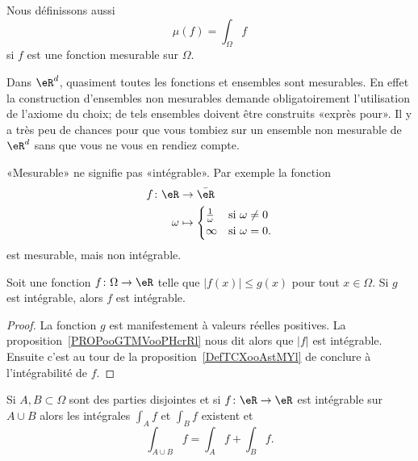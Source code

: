 Nous définissons aussi
\begin{equation}
    \mu(f)=\int_{\Omega}f
\end{equation}
si \( f\) est une fonction mesurable sur \( \Omega\).

\begin{remark}
    Dans \( \eR^d\), quasiment toutes les fonctions et ensembles sont mesurables. En effet la construction d'ensembles non mesurables demande obligatoirement l'utilisation de l'axiome du choix; de tels ensembles doivent être construits «exprès pour». Il y a très peu de chances pour que vous tombiez sur un ensemble non mesurable de \( \eR^d\) sans que vous ne vous en rendiez compte.
\end{remark}

\begin{remark}
    «Mesurable» ne signifie pas «intégrable». Par exemple la fonction
    \begin{equation}
        \begin{aligned}
            f\colon \eR&\to \bar\eR \\
            \omega&\mapsto\begin{cases}
            \frac{1}{ \omega }    &   \text{si } \omega\neq 0\\
            \infty    &    \text{si }\omega=0.
            \end{cases}
        \end{aligned}
    \end{equation}
    est mesurable, mais non intégrable.
\end{remark}

\begin{lemma}   \label{LemPfHgal}
    Soit une fonction \( f\colon \Omega\to \eR\) telle que \( | f(x)|\leq g(x) \) pour tout \( x\in\Omega\). Si \( g\) est intégrable, alors \( f\) est intégrable.
\end{lemma}

\begin{proof}
    La fonction \( g\) est manifestement à valeurs réelles positives. La proposition~\ref{PROPooGTMVooPHcrRl} nous dit alors que \( | f |\) est intégrable. Ensuite c'est au tour de la proposition~\ref{DefTCXooAstMYl} de conclure à l'intégrabilité de \( f\).
\end{proof}

\begin{proposition}     \label{PropOPSCooVpzaBt}
    Si \( A,B\subset \Omega\) sont des parties disjointes et si \( f\colon \eR\to \eR\) est intégrable sur \( A\cup B\) alors les intégrales \( \int_Af\) et \( \int_Bf\) existent et
    \begin{equation}
        \int_{A\cup B}f=\int_Af+\int_Bf.
    \end{equation}
\end{proposition}

